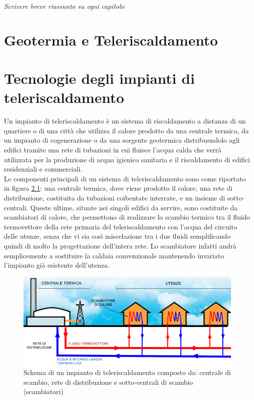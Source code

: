 \documentclass[laurea,oneside,11pt]{USiena_tesiLM}
\begin{document}
\textit{Scrivere breve riassunto su ogni capitolo}

\chapter{Geotermia e Teleriscaldamento}

\chapter{Tecnologie degli impianti di teleriscaldamento}
Un impianto di teleriscaldamento è un  sistema di riscaldamento a distanza di un quartiere o di una città 
che utilizza il calore prodotto da una centrale termica, da un impianto di cogenerazione 
o da una sorgente geotermica distribuendolo agli edifici tramite una rete di tubazioni in cui fluisce l'acqua calda che verrà utilizzata per la produzione di acqua igienico sanitaria e il riscaldamento di edifici residenziali e commerciali.  \\
Le componenti principali di un sistema di teleriscaldamento sono come riportato in figura \ref{fig:schema1}: una centrale termica, dove viene prodotto il calore, una rete di distribuzione, costituita da tubazioni 
coibentate interrate, e un insieme di sotto-centrali. Queste ultime, situate nei singoli 
edifici da servire, sono costituite da scambiatori di calore, che permettono di realizzare 
lo scambio termico tra il fluido termovettore  della rete primaria del teleriscaldamento con l'acqua del circuito delle utenze, senza che vi sia così miscelazione tra i due fluidi semplificando quindi di molto la progettazione dell'intera rete. Lo scambiatore infatti andrà semplicemente a sostituire la  caldaia convenzionale mantenendo invariato l'impianto già esistente dell'utenza.

\begin{figure}[h]
\begin{center}
\includegraphics[width=1.0\textwidth]{figure/schema_impianto1}
\caption{Schema di un impianto di teleriscaldamento composto da: centrale di scambio, rete di distribuzione e sotto-centrali di scambio (scambiatori)}
\label{fig:schema1}
\end{center}
\end{figure}
\end{document}
